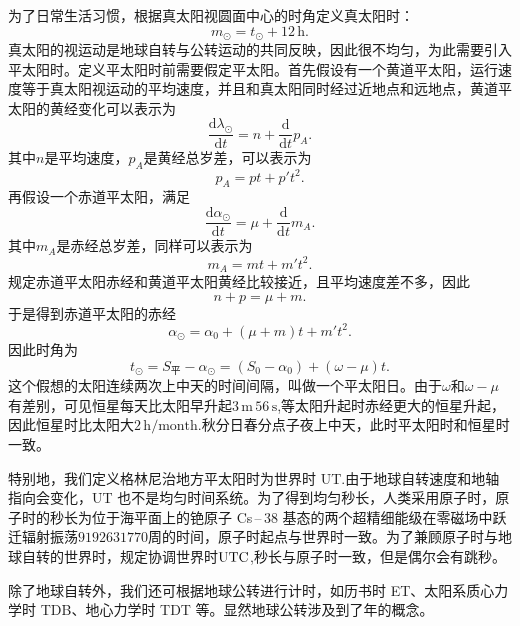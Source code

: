\documentclass[11pt, a4paper, oneside]{ctexart}
\numberwithin{equation}{subsection}
\begin{document}
为了日常生活习惯，根据真太阳视圆面中心的时角定义真太阳时：
\begin{equation}
m_\odot=t_\odot+12\,\mathrm{h}.
\end{equation}
真太阳的视运动是地球自转与公转运动的共同反映，因此很不均匀，为此需要引入平太阳时。定义平太阳时前需要假定平太阳。首先假设有一个黄道平太阳，运行速度等于真太阳视运动的平均速度，并且和真太阳同时经过近地点和远地点，黄道平太阳的黄经变化可以表示为
\begin{equation}
\frac{\mathrm{d}\lambda_{\odot}}{\mathrm{d}t}=n+\frac{\mathrm{d}}{\mathrm{d}t}p_{A}.
\end{equation}
其中$n$是平均速度，$p_{A}$是黄经总岁差，可以表示为
\begin{equation}
p_{A}=pt+p't^{2}.
\end{equation}
再假设一个赤道平太阳，满足
\begin{equation}
\frac{\mathrm{d}\alpha_{\odot}}{\mathrm{d}t}=\mu+\frac{\mathrm{d}}{\mathrm{d}t}m_{A}.
\end{equation}
其中$m_{A}$是赤经总岁差，同样可以表示为
\begin{equation}
m_{A}=mt+m't^{2}.
\end{equation}
规定赤道平太阳赤经和黄道平太阳黄经比较接近，且平均速度差不多，因此
\begin{equation}
n+p=\mu+m.
\end{equation}
于是得到赤道平太阳的赤经
\begin{equation}
\alpha_{\odot}=\alpha_{0}+\left(\mu+m\right)t+m't^{2}.
\end{equation}
因此时角为
\begin{equation}
t_{\odot}=S_{\text{平}}-\alpha_{\odot}=\left(S_{0}-\alpha_{0}\right)+\left(\omega-\mu\right)t.
\end{equation}
这个假想的太阳连续两次上中天的时间间隔，叫做一个平太阳日。由于$\omega$和$\omega-\mu$有差别，可见恒星每天比太阳早升起$3\,\mathrm{m}\,56\,\mathrm{s}$,等太阳升起时赤经更大的恒星升起，因此恒星时比太阳大$2\,\mathrm{h/month}$.秋分日春分点子夜上中天，此时平太阳时和恒星时一致。

特别地，我们定义格林尼治地方平太阳时为世界时 UT.由于地球自转速度和地轴指向会变化，UT 也不是均匀时间系统。为了得到均匀秒长，人类采用原子时，原子时的秒长为位于海平面上的铯原子 Cs\,--\,38 基态的两个超精细能级在零磁场中跃迁辐射振荡$9192631770$周的时间，原子时起点与世界时一致。为了兼顾原子时与地球自转的世界时，规定协调世界时$\rm UTC$,秒长与原子时一致，但是偶尔会有跳秒。

除了地球自转外，我们还可根据地球公转进行计时，如历书时 ET、太阳系质心力学时 TDB、地心力学时 TDT 等。显然地球公转涉及到了年的概念。
\end{document}
